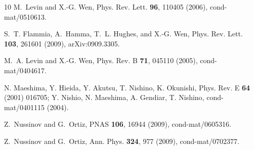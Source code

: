 \documentclass{article}
\theoremstyle{plain}
\theoremstyle{definition}
\numberwithin{equation}{section}  %
\begin{document}
\begin{thebibliography}{10}
    M.~Levin and X.-G. Wen,
    \newblock Phys. Rev. Lett. {\bf 96}, 110405 (2006), cond-mat/0510613.

    S.~T. Flammia, A.~Hamma, T.~L. Hughes, and X.-G. Wen,
    \newblock Phys. Rev. Lett. {\bf 103}, 261601 (2009), arXiv:0909.3305.

    M.~A. Levin and X.-G. Wen,
    \newblock Phys. Rev. B {\bf 71}, 045110 (2005), cond-mat/0404617.

    N. Maeshima, Y. Hieida, Y. Akutsu, T. Nishino, K. Okunishi, Phys. Rev. E
    \textbf{64} (2001) 016705; Y. Nishio, N. Maeshima, A. Gendiar, T. Nishino,
    cond-mat/0401115 (2004).

    Z.~Nussinov and G.~Ortiz,
    \newblock PNAS {\bf 106}, 16944 (2009), cond-mat/0605316.

    Z.~Nussinov and G.~Ortiz,
    \newblock Ann. Phys. {\bf 324}, 977 (2009), cond-mat/0702377.

\end{thebibliography}
\end{document}

